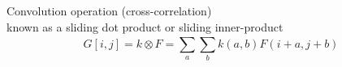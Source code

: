 \documentclass[10pt,aspectratio=169,dvipsnames]{beamer}
\begin{document}
	\begin{frame}
		\noindent
		\alert{Convolution operation (cross-correlation)} \\ 
		known as a \alert{sliding dot product} or \alert{sliding inner-product}
		\begin{equation*}
			G[i,j]= k \otimes F  = {\sum_{a}^{}\sum_{b}k(a,b)F(i+a, j+b)}
		\end{equation*}		
	\end{frame}	
\end{document}
